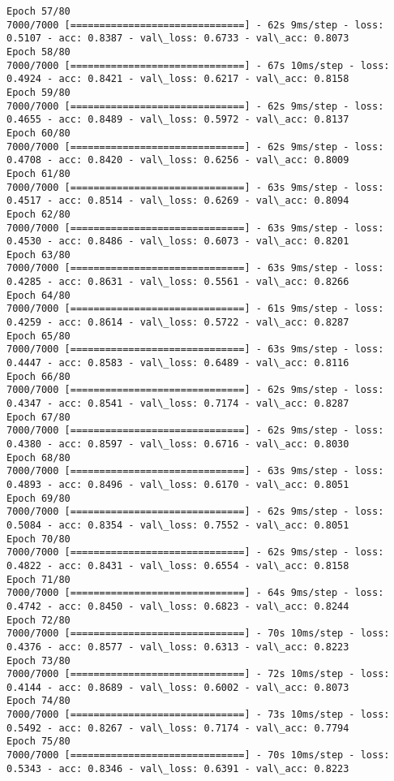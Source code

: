 \documentclass[11pt]{article}
\begin{document}
\begin{Verbatim}[commandchars=\\\{\}]
Epoch 57/80
7000/7000 [==============================] - 62s 9ms/step - loss: 0.5107 - acc: 0.8387 - val\_loss: 0.6733 - val\_acc: 0.8073
Epoch 58/80
7000/7000 [==============================] - 67s 10ms/step - loss: 0.4924 - acc: 0.8421 - val\_loss: 0.6217 - val\_acc: 0.8158
Epoch 59/80
7000/7000 [==============================] - 62s 9ms/step - loss: 0.4655 - acc: 0.8489 - val\_loss: 0.5972 - val\_acc: 0.8137
Epoch 60/80
7000/7000 [==============================] - 62s 9ms/step - loss: 0.4708 - acc: 0.8420 - val\_loss: 0.6256 - val\_acc: 0.8009
Epoch 61/80
7000/7000 [==============================] - 63s 9ms/step - loss: 0.4517 - acc: 0.8514 - val\_loss: 0.6269 - val\_acc: 0.8094
Epoch 62/80
7000/7000 [==============================] - 63s 9ms/step - loss: 0.4530 - acc: 0.8486 - val\_loss: 0.6073 - val\_acc: 0.8201
Epoch 63/80
7000/7000 [==============================] - 63s 9ms/step - loss: 0.4285 - acc: 0.8631 - val\_loss: 0.5561 - val\_acc: 0.8266
Epoch 64/80
7000/7000 [==============================] - 61s 9ms/step - loss: 0.4259 - acc: 0.8614 - val\_loss: 0.5722 - val\_acc: 0.8287
Epoch 65/80
7000/7000 [==============================] - 63s 9ms/step - loss: 0.4447 - acc: 0.8583 - val\_loss: 0.6489 - val\_acc: 0.8116
Epoch 66/80
7000/7000 [==============================] - 62s 9ms/step - loss: 0.4347 - acc: 0.8541 - val\_loss: 0.7174 - val\_acc: 0.8287
Epoch 67/80
7000/7000 [==============================] - 62s 9ms/step - loss: 0.4380 - acc: 0.8597 - val\_loss: 0.6716 - val\_acc: 0.8030
Epoch 68/80
7000/7000 [==============================] - 63s 9ms/step - loss: 0.4893 - acc: 0.8496 - val\_loss: 0.6170 - val\_acc: 0.8051
Epoch 69/80
7000/7000 [==============================] - 62s 9ms/step - loss: 0.5084 - acc: 0.8354 - val\_loss: 0.7552 - val\_acc: 0.8051
Epoch 70/80
7000/7000 [==============================] - 62s 9ms/step - loss: 0.4822 - acc: 0.8431 - val\_loss: 0.6554 - val\_acc: 0.8158
Epoch 71/80
7000/7000 [==============================] - 64s 9ms/step - loss: 0.4742 - acc: 0.8450 - val\_loss: 0.6823 - val\_acc: 0.8244
Epoch 72/80
7000/7000 [==============================] - 70s 10ms/step - loss: 0.4376 - acc: 0.8577 - val\_loss: 0.6313 - val\_acc: 0.8223
Epoch 73/80
7000/7000 [==============================] - 72s 10ms/step - loss: 0.4144 - acc: 0.8689 - val\_loss: 0.6002 - val\_acc: 0.8073
Epoch 74/80
7000/7000 [==============================] - 73s 10ms/step - loss: 0.5492 - acc: 0.8267 - val\_loss: 0.7174 - val\_acc: 0.7794
Epoch 75/80
7000/7000 [==============================] - 70s 10ms/step - loss: 0.5343 - acc: 0.8346 - val\_loss: 0.6391 - val\_acc: 0.8223

\end{Verbatim}
\end{document}
